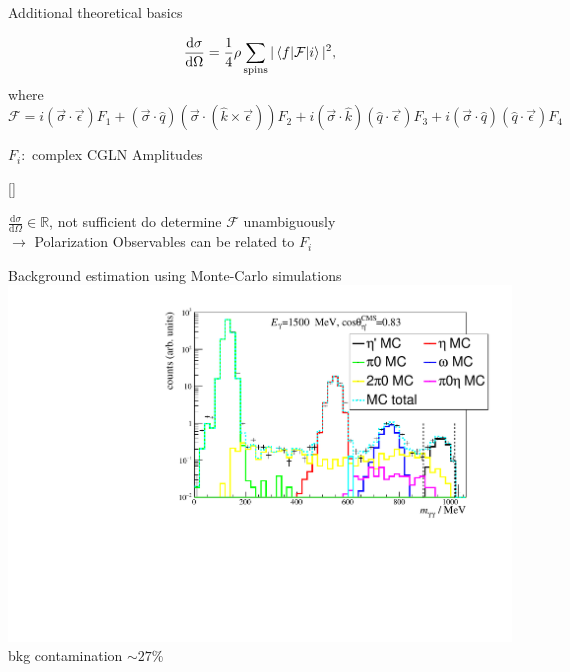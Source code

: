 \documentclass[11pt,aspectratio=169,dvipsnames]{beamer}
\newcommand{\thecolor}{black!70!blue}
\begin{document}
	\begin{frame}{Additional theoretical basics}
		\begin{tcolorbox}[colback=blue!5,colframe=\thecolor,title=Unpolarized differential cross section]
			
			$$\frac{\text{d}\sigma}{\text{d}\Omega}=\frac{1}{4}\rho\sum_{\text{spins}}|\braket{f|\mathcal{F}|i}|^2\\,$$
			where
			$$\mathcal{F}=i(\vec{\sigma}\cdot\vec{\epsilon})F_1+(\vec{\sigma}\cdot\hat{q})(\vec{\sigma}\cdot(\hat{k}\times\vec{\epsilon}))F_2+i(\vec{\sigma}\cdot\hat{k})(\hat{q}\cdot\vec{\epsilon})F_3+i(\vec{\sigma}\cdot\hat{q})(\hat{q}\cdot\vec{\epsilon})F_4$$
			\begin{flushright}
				$F_i:$ complex CGLN Amplitudes
			\end{flushright}
			
			
			\begin{flushright}
				{\scriptsize[\cite{cgln}]}
			\end{flushright}
		\end{tcolorbox}
		$\frac{\text{d}\sigma}{\text{d}\Omega}\in\mathbb{R}$, not sufficient do determine $\mathcal{F}$ unambiguously\\
		$\rightarrow$ Polarization Observables can be related to $F_i$
	\end{frame}
	\begin{frame}{Background estimation using Monte-Carlo simulations}
		\centering
		\includegraphics[width=.8\linewidth]{figs/inv_mass_bin.pdf}\vspace{-0.5cm}\\
		bkg contamination $\sim 27\%$
	\end{frame}
\end{document}
